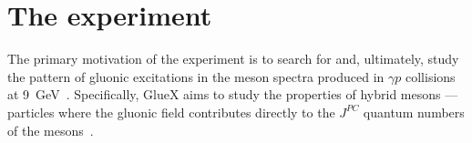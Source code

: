 

\section[The \gx{} experiment (TCR/Curtis)]{The \gx{} experiment \label{sec:gluexexperiment} }

The primary motivation of the \gx{} experiment is to search for and, ultimately, study the pattern of gluonic excitations in the meson spectra produced 
in $\gamma p$ collisions at 9~GeV~\cite{gluex-ref}. Specifically, GlueX aims to study the properties of hybrid mesons --- particles where the gluonic field 
contributes directly to the $J^{PC}$ quantum numbers of the mesons~\cite{meyer:2015eta}. 

